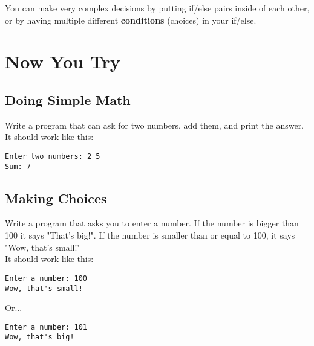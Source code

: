 \documentclass[a4paper,12pt]{article} %
\begin{document}
\noindent
You can make very complex decisions by putting if/else pairs inside of each other, or by having multiple different \textbf{conditions} (choices) in your if/else.

\section{Now You Try}

\subsection*{Doing Simple Math}

Write a program that can ask for two numbers, add them, and print the answer. It should work like this:

\begin{verbatim}
Enter two numbers: 2 5
Sum: 7
\end{verbatim}

\subsection*{Making Choices}

Write a program that asks you to enter a number. If the number is bigger than 100 it says "That's big!". If the number is smaller than or equal to 100, it says "Wow, that's small!"\\

\noindent
It should work like this:

\begin{verbatim}
Enter a number: 100
Wow, that's small!
\end{verbatim}

\noindent
Or...

\begin{verbatim}
Enter a number: 101
Wow, that's big!
\end{verbatim}
\end{document}
